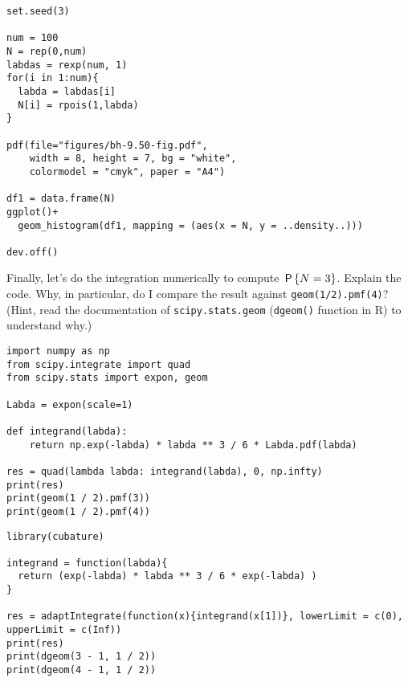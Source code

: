 \begin{verbatim}
set.seed(3)

num = 100
N = rep(0,num)
labdas = rexp(num, 1)
for(i in 1:num){
  labda = labdas[i]
  N[i] = rpois(1,labda)
}

pdf(file="figures/bh-9.50-fig.pdf",
    width = 8, height = 7, bg = "white",          
    colormodel = "cmyk", paper = "A4")

df1 = data.frame(N)
ggplot()+
  geom_histogram(df1, mapping = (aes(x = N, y = ..density..)))

dev.off()
\end{verbatim}

\begin{exercise}
Finally, let's do the integration numerically to compute $\P{N=3}$. Explain the code. Why, in particular, do I compare the result against \texttt{geom(1/2).pmf(4)}? (Hint, read the documentation of \texttt{scipy.stats.geom} (\texttt{dgeom()} function in R) to understand why.)
\begin{verbatim}
import numpy as np
from scipy.integrate import quad
from scipy.stats import expon, geom

Labda = expon(scale=1)

def integrand(labda):
    return np.exp(-labda) * labda ** 3 / 6 * Labda.pdf(labda)

res = quad(lambda labda: integrand(labda), 0, np.infty)
print(res)
print(geom(1 / 2).pmf(3))
print(geom(1 / 2).pmf(4))
\end{verbatim}

\begin{verbatim}
library(cubature)  

integrand = function(labda){
  return (exp(-labda) * labda ** 3 / 6 * exp(-labda) )
}

res = adaptIntegrate(function(x){integrand(x[1])}, lowerLimit = c(0), upperLimit = c(Inf))
print(res)
print(dgeom(3 - 1, 1 / 2))
print(dgeom(4 - 1, 1 / 2))
\end{verbatim}

\end{exercise}





